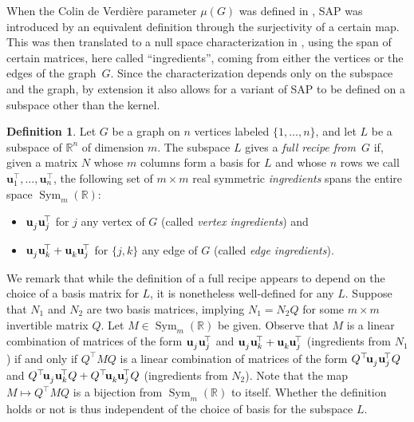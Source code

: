 \documentclass{article}
\theoremstyle{definition}
\newtheorem{definition}[theorem]{Definition}
\newcommand{\trans}{^\top}
\newcommand{\bu}{\mathbf{u}}
\newcommand{\msym}[1][n]{\operatorname{Sym}_{#1}(\mathbb{R})}
\begin{document}
When the Colin de Verdière parameter $\mu(G)$ was defined in \cite{CdV,CdVF}, SAP was introduced by an equivalent definition through the surjectivity of a certain map.
This was then translated to a null space characterization in \cite{ADH2021,H2010},
using the span of certain matrices, here called ``ingredients'', coming from either the vertices or the edges of the graph~$G$.
Since the characterization depends only on the subspace and the graph,
by extension it also allows for a variant of SAP to be defined on a subspace other than the kernel.

\newcommand{\uprod}[2]{\bu_{#1}^{\phantom{\trans}}\mspace{-3.5mu}
    \bu_{#2}^{\mspace{-3mu}\top}}

\begin{definition}
\label{def:recipe}
Let $G$ be a graph on $n$ vertices labeled $\{1, \dots, n\}$, and let $L$ be a subspace of $\mathbb{R}^n$ of dimension $m$. The subspace $L$ gives a \emph{full recipe from~$G$} if, given a matrix $N$ whose $m$ columns form a basis for $L$
and whose $n$ rows we call $\bu_1\trans, \dots, \bu_n\trans$, the following set of $m \times m$ real symmetric \emph{ingredients} spans
the entire space $\msym[m]$:
\begin{itemize}
\item $\uprod{j}{j}$ for $j$ any vertex of $G$ (called \emph{vertex ingredients}) and
\item $\uprod{j}{k} + \uprod{k}{j}$ for $\{j,k\}$ any edge of $G$ (called \emph{edge ingredients}).
\end{itemize}
\end{definition}

We remark that while the definition of a full recipe appears to depend on the choice of a basis matrix for $L$, it is nonetheless well-defined for any $L$.
Suppose that $N_1$ and $N_2$ are two basis matrices, implying $N_1 = N_2Q$ for some $m\times m$ invertible matrix $Q$.  Let $M\in\msym[m]$ be given.  Observe that $M$ is a linear combination of matrices of the form $\uprod{j}{j}$ and $\uprod{j}{k} + \uprod{k}{j}$ (ingredients from $N_1$) if and only if $Q\trans\! MQ$ is a linear combination of matrices of the form $Q\trans \!\uprod{j}{j}Q$ and $Q\trans \!\uprod{j}{k} Q + Q\trans \!\uprod{k}{j} Q$ (ingredients from $N_2$).
Note that the map $M \mapsto Q\trans \! MQ$ is a bijection from $\msym[m]$ to itself.
Whether the definition holds or not is thus independent of the choice of basis for the subspace $L$.
\end{document}
